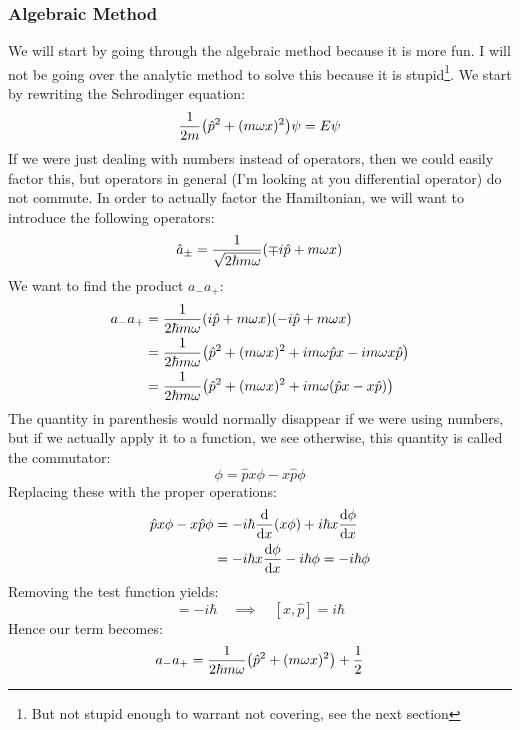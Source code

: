 \subsubsection{Algebraic Method}
We will start by going through the algebraic method because it is more fun. I will not be going over the analytic method to solve this because it is stupid\footnote{But not stupid enough to warrant not covering, see the next section}. We start by rewriting the Schrodinger equation:
\begin{equation*}
  \dfrac{1}{2m}\qty(\hat{p}^2+(m\omega x)^2)\psi=E\psi
\end{equation*}
If we were just dealing with numbers instead of operators, then we could easily factor this, but operators in general (I'm looking at you differential operator) do not commute. In order to actually factor the Hamiltonian, we will want to introduce the following operators:
\begin{equation*}
  \hat{a}_{\pm}=\dfrac{1}{\sqrt{2\hbar m\omega}}\qty(\mp i\hat{p}+m\omega x)
\end{equation*}
We want to find the product $a_-a_+$:
\begin{align*}
  a_-a_+&=\dfrac{1}{2\hbar m\omega}\qty(i\hat{p}+m\omega x)(-i\hat{p}+m\omega x) \\
  &=\dfrac{1}{2\hbar m\omega}
  \qty(\hat{p}^2+(m\omega x)^2+im\omega \hat{p}x-im\omega x\hat{p}) \\
  &=\dfrac{1}{2\hbar m\omega}
  \qty(\hat{p}^2+(m\omega x)^2+im\omega(\hat{p}x-x\hat{p})) 
\end{align*}
The quantity in parenthesis would normally disappear if we were using numbers, but if we actually apply it to a function, we see otherwise, this quantity is called the commutator:
\begin{equation*}
  [\hat{p},x]\phi=\hat{p}x\phi-x\hat{p}\phi
\end{equation*}
Replacing these with the proper operations:
\begin{align*}
  \hat{p}x\phi-x\hat{p}\phi&=-i\hbar\dv{x}\qty(x\phi)+i\hbar x\dv{\phi}{x} \\
  &=-i\hbar x\dv{\phi}{x}-i\hbar\phi =-i\hbar\phi
\end{align*}
Removing the test function yields:
\begin{equation*}
  [\hat{p},x]=-i\hbar\quad\implies\quad[x,\hat{p}]=i\hbar
\end{equation*}
Hence our term becomes:
\begin{equation*}
  a_-a_+=\dfrac{1}{2\hbar m\omega}\qty(\hat{p}^2+(m\omega x)^2)+\dfrac{1}{2}
\end{equation*}
